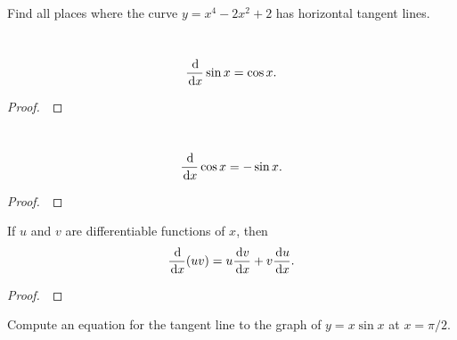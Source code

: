 \newpage

\begin{example}
Find all places where the curve $y=x^4-2x^2+2$ has horizontal tangent lines.
\end{example}

\newpage

\begin{theorem}\,
\begin{equation*}
\frac{\mkern 2mu \mathrm{d}}{\mkern 2mu \mathrm{d} x}\sin x = \cos x.
\end{equation*}
\end{theorem}
\begin{proof}\,

\vspace{3in}
\end{proof}

\begin{theorem}\,
\begin{equation*}
\frac{\mkern 2mu \mathrm{d}}{\mkern 2mu \mathrm{d} x}\cos x = -\sin x.
\end{equation*}
\end{theorem}
\begin{proof}\,

\vspace{3in}
\end{proof}

\newpage

\begin{theorem}
If $u$ and $v$ are differentiable functions of $x$, then
\begin{equation*}
\frac{\mkern 2mu \mathrm{d}}{\mkern 2mu \mathrm{d} x}(uv) = u\frac{\mkern 2mu \mathrm{d} v}{\mkern 2mu \mathrm{d} x} + v\frac{\mkern 2mu \mathrm{d} u}{\mkern 2mu \mathrm{d} x}.
\end{equation*}
\end{theorem}
\begin{proof}\,

\vspace{5in}
\end{proof}

\newpage

\begin{example}
Compute an equation for the tangent line to the graph of $y=x\sin x$ at $x=\pi/2$.
\end{example}

\newpage


